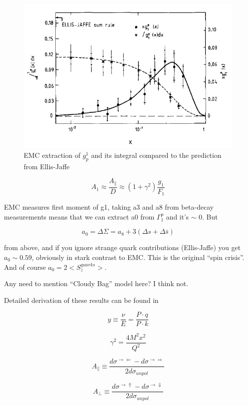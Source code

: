 \begin{figure}
  \includegraphics[width=1.0\textwidth]{figures/emc-g1p}
  \caption{EMC extraction of $g^1_p$ and its integral compared to the prediction from Ellis-Jaffe \cite{Ashman:1987hv}}
  \label{fig:emc-g1p}
\end{figure}

\begin{equation}
  A_1 \approx \frac{A_{\parallel}}{D} \approx (1 + \gamma^2)\frac{g_1}{F_1}
\end{equation}

EMC measures first moment of g1, taking a3 and a8 from beta-decay measurements means that we can extract a0 from $\Gamma_1^p$ and it's $\sim$ 0.  But

\begin{equation}
  a_0 = \Delta \Sigma = a_8 + 3(\Delta s + \Delta \bar{s})
\end{equation}

from above, and if you ignore strange quark contributions (Ellis-Jaffe) you get $a_0 \sim 0.59$, obviously in stark contrast to EMC.  This is the original ``spin crisis''.  And of course $a_0 = 2<S_z^{quarks}>$.

Any need to mention ``Cloudy Bag'' model here?  I think not.

Detailed derivation of these results can be found in \cite{Anselmino:1994gn}

\begin{equation}
  y \equiv \frac{\nu}{E} = \frac{P \cdot q}{P \cdot k}
\end{equation}

\begin{equation}
  \gamma^2 = \frac{4M^2x^2}{Q^2}
\end{equation}

\begin{equation}
  A_{\parallel} \equiv \frac{d\sigma^{\rightarrow \Leftarrow} - d\sigma^{\rightarrow \Rightarrow}}{2d\sigma_{unpol}}
\end{equation}

\begin{equation}
  A_{\perp} \equiv \frac{d\sigma^{\rightarrow \Uparrow} - d\sigma^{\rightarrow \Downarrow}}{2d\sigma_{unpol}}
\end{equation}